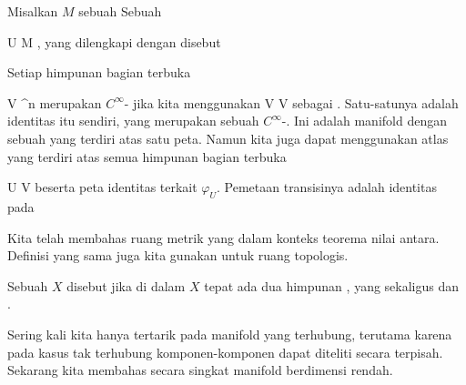 {}
{

Misalkan $M$ sebuah
Sebuah

\mavergleichskette
{\vergleichskette
{ U
}
{ \subseteq }{ M
}
{  }{
}
{    }{
}
{   }{
}
}
{}{}{,}
yang dilengkapi dengan
disebut 

}

{

Setiap himpunan bagian terbuka

\mavergleichskette
{\vergleichskette
{ V
}
{ \subseteq }{ \R^n
}
{  }{
}
{    }{
}
{   }{
}
}
{}{}{}
merupakan
$C^\infty$-
jika kita menggunakan
 { V } { V
} {}
sebagai
.
Satu-satunya
adalah identitas itu sendiri, yang merupakan sebuah $C^\infty$-.
Ini adalah manifold dengan sebuah
yang terdiri atas satu peta. Namun kita juga dapat menggunakan atlas yang terdiri atas semua himpunan bagian terbuka

\mavergleichskette
{\vergleichskette
{ U
}
{ \subseteq }{ V
}
{  }{
}
{    }{
}
{   }{
}
}
{}{}{}
beserta peta identitas terkait $\varphi_U$. Pemetaan transisinya adalah identitas pada 

}

Kita telah membahas ruang metrik yang
dalam konteks teorema nilai antara. Definisi yang sama juga kita gunakan untuk ruang topologis.

{}
{

Sebuah
$X$ disebut  jika di dalam $X$ tepat ada dua himpunan
 {} {,}
yang sekaligus
dan
.

}

Sering kali kita hanya tertarik pada manifold yang terhubung, terutama karena pada kasus tak terhubung komponen-komponen  dapat diteliti secara terpisah. Sekarang kita membahas secara singkat manifold berdimensi rendah.

